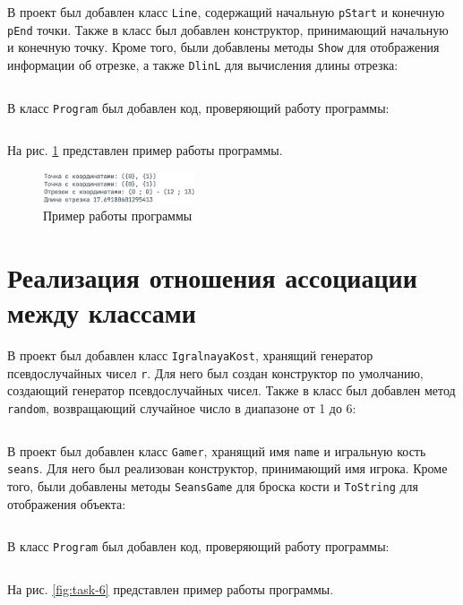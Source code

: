 \documentclass[a4paper,14pt]{extarticle}
\numberwithin{figure}{section}
\begin{document}
\inputminted{csharp}{../MyClassLine/Point.cs}

В проект был добавлен класс \texttt{Line}, содержащий начальную \texttt{pStart} и конечную \texttt{pEnd} точки. Также в класс был добавлен конструктор, принимающий начальную и конечную точку. Кроме того, были добавлены методы \texttt{Show} для отображения информации об отрезке, а также \texttt{DlinL} для вычисления длины отрезка:

\inputminted{csharp}{../MyClassLine/Line.cs}

В класс \texttt{Program} был добавлен код, проверяющий работу программы:

\inputminted{csharp}{../MyClassLine/Program.cs}

На рис. \ref{fig:task-5} представлен пример работы программы.

\begin{figure}[H]
    \centering
    \includegraphics[width=0.4\textwidth]{images/task-5.png}
    \caption{Пример работы программы}
    \label{fig:task-5}
\end{figure}

\section{Реализация отношения ассоциации между классами}

В проект был добавлен класс \texttt{IgralnayaKost}, хранящий генератор псевдослучайных чисел \texttt{r}. Для него был создан конструктор по умолчанию, создающий генератор псевдослучайных чисел. Также в класс был добавлен метод \texttt{random}, возвращающий случайное число в диапазоне от 1 до 6:

\inputminted{csharp}{../Igra/IgralnayaKost.cs}

В проект был добавлен класс \texttt{Gamer}, хранящий имя \texttt{name} и игральную кость \texttt{seans}. Для него был реализован конструктор, принимающий имя игрока. Кроме того, были добавлены методы \texttt{SeansGame} для броска кости и \texttt{ToString} для отображения объекта:

\inputminted{csharp}{../Igra/Gamer.cs}

В класс \texttt{Program} был добавлен код, проверяющий работу программы:

\inputminted{csharp}{../Igra/Program.cs}

На рис. \ref{fig:task-6} представлен пример работы программы.
\end{document}
